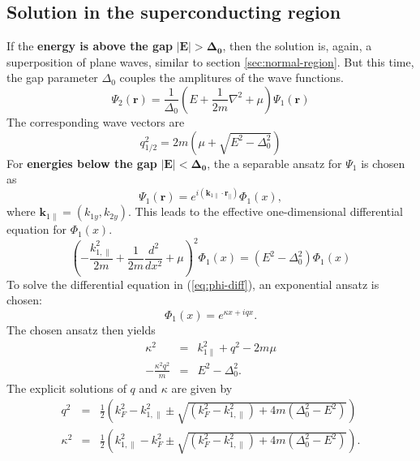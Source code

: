 \subsection{Solution in the superconducting region}
 
If the \textbf{energy is above the gap} $\mathbf{ |E| > \Delta_0}$, then the solution is, again, a superposition of plane waves, similar to section \ref{sec:normal-region}. But this time, the gap parameter $\Delta_0$ couples the amplitures of the wave functions.
\begin{equation}
\Psi_2 \left( \mathbf{r} \right)  = \frac{1}{\Delta_0} \left( E + \frac{1}{2m} \nabla^2 + \mu \right) \Psi_1 \left( \mathbf{r}  \right) \label{eq:psi-coupling}
\end{equation}
The corresponding wave vectors are 
\begin{equation}
q_{1/2}^2 = 2m \left( \mu + \sqrt{E^2 - \Delta_0^2} \right)
\end{equation}
\newline
For \textbf{energies below the gap} $\mathbf{ |E| < \Delta_0}$, the a separable ansatz for $\Psi_1$ is chosen as
\begin{equation}
\Psi_1 \left( \mathbf{r} \right)  = e^{i ( \mathbf{k}_{1 \parallel} \cdot \mathbf{r}_{\parallel} ) } \Phi_1\left( x \right),
\end{equation}
where $\mathbf{k}_{1 \parallel} = (k_{1y}, k_{2y})$. This leads to the effective one-dimensional differential equation for $\Phi_1\left( x \right)$.
\begin{equation}
\left( - \frac{k_{1, \parallel}^2}{2m} + \frac{1}{2m} \frac{d^2}{dx^2} + \mu \right)^2 \Phi_1\left( x \right) = (E^2 - \Delta_0^2) \Phi_1\left( x \right) \label{eq:phi-diff}
\end{equation}
To solve the differential equation in (\ref{eq:phi-diff}), an exponential ansatz is chosen:
\begin{equation}
\Phi_1(x) = e^{\kappa x + i q x}.
\end{equation}
The chosen ansatz then yields
\begin{eqnarray}
\kappa^2 &=& k_{1\parallel}^2 + q^2 - 2m\mu \\
- \frac{\kappa^2 q^2}{m} &=& E^2 - \Delta_0^2.
\end{eqnarray}
The explicit solutions of $q$ and $\kappa$ are given by
\begin{eqnarray}
q^2 &=& \frac{1}{2}\left( k_F^2 - k_{1, \parallel}^2 \pm \sqrt{ (k_F^2 - k_{1, \parallel}^2) + 4m(\Delta_0^2 - E^2)} \right) \label{eq:q2}\\
\kappa^2 &=& \frac{1}{2}\left( k_{1, \parallel}^2 - k_F^2 \pm \sqrt{ (k_F^2 - k_{1, \parallel}^2) + 4m(\Delta_0^2 - E^2)} \right)\label{eq:kappa2}.
\end{eqnarray}
